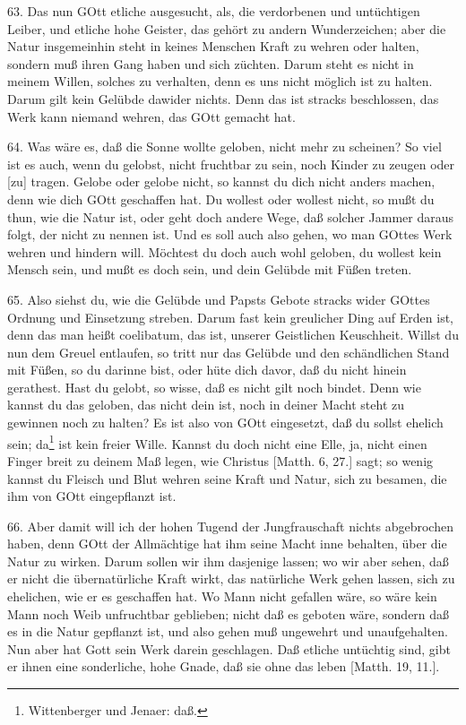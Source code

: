 63. Das nun GOtt etliche ausgesucht, als, die verdorbenen und untüchtigen Leiber, und etliche hohe Geister, das gehört zu andern Wunderzeichen; aber die Natur insgemeinhin steht in keines Menschen Kraft zu wehren oder halten, sondern muß ihren Gang haben und sich züchten. Darum steht es nicht in meinem Willen, solches zu verhalten, denn es uns nicht möglich ist zu halten. Darum gilt kein Gelübde dawider nichts. Denn das ist stracks beschlossen, das Werk kann niemand wehren, das GOtt gemacht hat.

64. Was wäre es, daß die Sonne wollte geloben, nicht mehr zu scheinen? So viel ist es auch, wenn du gelobst, nicht fruchtbar zu sein, noch Kinder zu zeugen oder [zu] tragen. Gelobe oder gelobe nicht, so kannst du dich nicht anders machen, denn wie dich GOtt geschaffen hat. Du wollest oder wollest nicht, so mußt du thun, wie die Natur ist, oder geht doch andere Wege, daß solcher Jammer daraus folgt, der nicht zu nennen ist. Und es soll auch also gehen, wo man GOttes Werk wehren und hindern will. Möchtest du doch auch wohl geloben, du wollest kein Mensch sein, und mußt es doch sein, und dein Gelübde mit Füßen treten.

65. Also siehst du, wie die Gelübde und Papsts Gebote stracks wider GOttes Ordnung und Einsetzung streben. Darum fast kein greulicher Ding auf Erden ist, denn das man heißt coelibatum, das ist, unserer Geistlichen Keuschheit. Willst du nun dem Greuel entlaufen, so tritt nur das Gelübde und den schändlichen Stand mit Füßen, so du darinne bist, oder hüte dich davor, daß du nicht hinein gerathest. Hast du gelobt, so wisse, daß es nicht gilt noch bindet. Denn wie kannst du das geloben, das nicht dein ist, noch in deiner Macht steht zu gewinnen noch zu halten? Es ist also von GOtt eingesetzt, daß du sollst ehelich sein; da\footnote{Wittenberger und Jenaer: daß.} ist kein freier Wille. Kannst du doch nicht eine Elle, ja, nicht einen Finger breit zu deinem Maß legen, wie Christus [Matth. 6, 27.] sagt; so wenig kannst du Fleisch und Blut wehren seine Kraft und Natur, sich zu besamen, die ihm von GOtt eingepflanzt ist.

66. Aber damit will ich der hohen Tugend der Jungfrauschaft nichts abgebrochen haben, denn GOtt der Allmächtige hat ihm seine Macht inne behalten, über die Natur zu wirken. Darum sollen wir ihm dasjenige lassen; wo wir aber sehen, daß er nicht die übernatürliche Kraft wirkt,
das natürliche Werk gehen lassen, sich zu ehelichen, wie er es geschaffen hat. Wo Mann nicht gefallen wäre, so wäre kein Mann noch Weib unfruchtbar geblieben; nicht daß es geboten wäre, sondern daß es in die Natur gepflanzt ist, und also gehen muß ungewehrt und unaufgehalten. Nun aber hat Gott sein Werk darein geschlagen. Daß etliche untüchtig sind, gibt er ihnen eine sonderliche, hohe Gnade, daß sie ohne das leben [Matth. 19, 11.].

